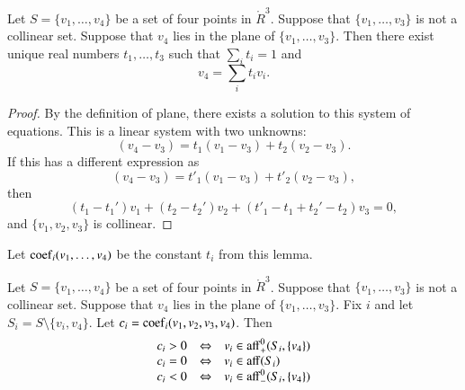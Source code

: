 \begin{tarskidata}
\begin{tarski}

\begin{lemma}
Let $S=\{v_1,\ldots,v_4\}$ be
a set of four points in $\ring{R}^3$.  Suppose
that $\{v_1,\ldots,v_3\}$ is not a collinear
set.   Suppose that $v_4$ lies in the plane of
$\{v_1,\ldots,v_3\}$.  
Then there exist unique real numbers
$t_1,\ldots,t_3$ such that $\sum_i t_i = 1$ and
	$$v_4 = \sum_i t_i v_i.$$
\end{lemma}

\begin{proof}  By the definition of plane,
there 
exists a solution to this system of equations.
This is a linear system with
two unknowns:
	$$(v_4- v_3) = t_1 (v_1-v_3) +
		t_2 (v_2-v_3).
	$$
If this has a different expression as
   $$
   (v_4- v_3) = t'_1 (v_1-v_3) +
		t'_2 (v_2-v_3),
   $$
then 
  $$
  (t_1-t_1') v_1 + (t_2-t_2') v_2 + (t'_1-t_1+t_2'-t_2) v_3 = 0,
  $$
and $\{v_1,v_2,v_3\}$ is collinear.
\end{proof}
\end{tarski}



\begin{tarski}

\begin{definition}[coef] 
Let ${\operatorname{coef}}_i(v_1,\ldots,v_4)$
be the constant $t_i$ from this lemma.
\end{definition}
\end{tarski}




\begin{tarski}

\begin{lemma}
Let $S=\{v_1,\ldots,v_4\}$ be
a set of four points in $\ring{R}^3$.  Suppose
that $\{v_1,\ldots,v_3\}$ is not a collinear
set. 
Suppose that $v_4$ lies in the plane of
$\{v_1,\ldots,v_3\}$.  
Fix $i$ and let $S_i = S\setminus \{v_i,v_4\}$.
Let $c_i = {\operatorname{coef}}_i(v_1,v_2,v_3,v_4)$. 
Then 
   $$
   \begin{array}{lll}
     c_i > 0  & \Leftrightarrow & v_i \in {\operatorname{aff}}_+^0(S_i,\{v_4\})\\
     c_i = 0 & \Leftrightarrow & v_i \in {\operatorname{aff}}(S_i)\\
     c_i < 0 & \Leftrightarrow & v_i \in {\operatorname{aff}}_-^0(S_i,\{v_4\})\\
     \end{array}
   $$
\end{lemma}


\end{tarski}
\end{tarskidata}

